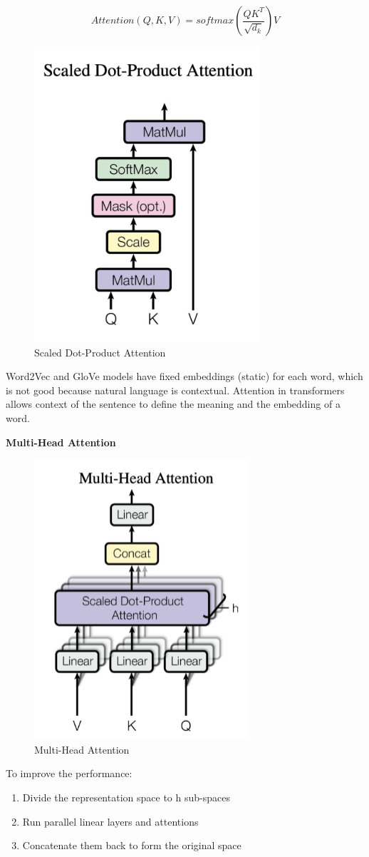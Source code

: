 \[ Attention(Q, K, V) = softmax(\frac{QK^T}{\sqrt{d_k}}) V \]

\begin{figure}[h!t]
    \centering
    \includegraphics[width=0.35\linewidth]{scaleddotprod.png}
    \caption{Scaled Dot-Product Attention}
    \label{fig:enter-label}
\end{figure}

\begin{idea}
    Word2Vec and GloVe models have fixed embeddings (static) for each word, which is not good because natural language is contextual. Attention in transformers allows context of the sentence to define the meaning and the embedding of a word.
\end{idea}

\noindent
\textbf{Multi-Head Attention}

\begin{figure}[h!t]
    \centering
    \includegraphics[width=0.3\linewidth]{multiheadattention.png}
    \caption{Multi-Head Attention}
    \label{fig:enter-label}
\end{figure}

To improve the performance:
\begin{enumerate}
    \item Divide the representation space to h sub-spaces
    \item Run parallel linear layers and attentions
    \item Concatenate them back to form the original space
\end{enumerate}

